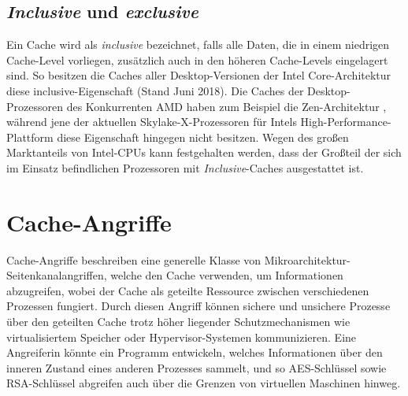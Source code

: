 




\subsection{\textit{Inclusive} und \textit{exclusive}}
Ein Cache wird als \textit{inclusive} bezeichnet, falls alle Daten, die in einem niedrigen Cache-Level vorliegen, zusätzlich auch in den höheren Cache-Levels eingelagert sind. 
So besitzen die Caches aller Desktop-Versionen der Intel Core-Architektur diese inclusive-Eigenschaft (Stand Juni 2018).
Die Caches der Desktop-Prozessoren des Konkurrenten AMD haben zum Beispiel die Zen-Architektur \cite{CacheRyzen}, während jene der aktuellen Skylake-X-Prozessoren \cite{CacheSkylakeX} für Intels High-Performance-Plattform diese Eigenschaft hingegen nicht besitzen.
Wegen des großen Marktanteils von Intel-CPUs kann festgehalten werden, dass der Großteil der sich im Einsatz befindlichen Prozessoren mit \textit{Inclusive}-Caches ausgestattet ist.

\section{Cache-Angriffe}

Cache-Angriffe beschreiben eine generelle Klasse von Mikro\-architektur-Seiten\-kanal\-angriffen, welche den Cache verwenden, um Informationen abzugreifen, wobei der Cache als geteilte Ressource zwischen verschiedenen Prozessen fungiert. Durch diesen Angriff können sichere und unsichere Prozesse über den geteilten Cache trotz höher liegender Schutzmechanismen wie virtualisiertem Speicher oder Hypervisor-Systemen kommunizieren. 
Eine Angreiferin könnte ein Programm entwickeln, welches Informationen über den inneren Zustand eines anderen Prozesses sammelt, und so AES-Schlüssel \cite{BernsteinAES} sowie RSA-Schlüssel \cite{CacheAttackRSA} abgreifen auch über die Grenzen von virtuellen Maschinen hinweg.


